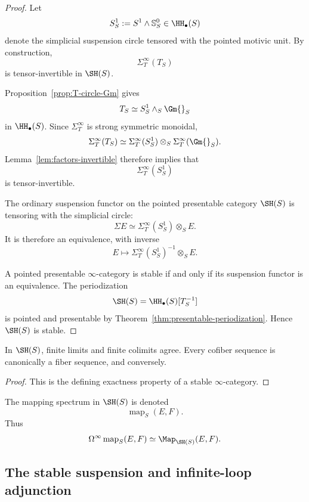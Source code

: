 \begin{proof}
Let
\[
    S^1_S
    :=
    S^1\wedge\mathbb S^0_S
    \in
    \HH_\bullet(S)
\]
denote the simplicial suspension circle tensored with the pointed motivic
unit.  By construction,
\[
    \Sigma_T^\infty(T_S)
\]
is tensor-invertible in \(\SH(S)\).

Proposition~\ref{prop:T-circle-Gm} gives
\[
    T_S
    \simeq
    S^1_S\wedge_S\Gm{}_S
\]
in \(\HH_\bullet(S)\).  Since \(\Sigma_T^\infty\) is strong symmetric
monoidal,
\[
    \Sigma_T^\infty(T_S)
    \simeq
    \Sigma_T^\infty(S^1_S)
    \otimes_S
    \Sigma_T^\infty(\Gm{}_S).
\]
Lemma~\ref{lem:factors-invertible} therefore implies that
\[
    \Sigma_T^\infty(S^1_S)
\]
is tensor-invertible.

The ordinary suspension functor on the pointed presentable category
\(\SH(S)\) is tensoring with the simplicial circle:
\[
    \Sigma E
    \simeq
    \Sigma_T^\infty(S^1_S)\otimes_SE.
\]
It is therefore an equivalence, with inverse
\[
    E
    \longmapsto
    \Sigma_T^\infty(S^1_S)^{-1}\otimes_SE.
\]

A pointed presentable \(\infty\)-category is stable if and only if its
suspension functor is an equivalence.  The periodization
\[
    \SH(S)
    =
    \HH_\bullet(S)[T_S^{-1}]
\]
is pointed and presentable by
Theorem~\ref{thm:presentable-periodization}.  Hence \(\SH(S)\) is stable.
\end{proof}

\begin{corollary}[Exactness]
\label{cor:SH-exactness}
In $\SH(S)$, finite limits and finite colimits agree.  Every cofiber sequence is canonically a fiber
sequence, and conversely.
\end{corollary}

\begin{proof}
This is the defining exactness property of a stable $\infty$-category.
\end{proof}

\begin{notation}
\label{not:mapping-spectra-SH}
The mapping spectrum in $\SH(S)$ is denoted
\[
    \operatorname{map}_S(E,F).
\]
Thus
\[
    \Omega^\infty\operatorname{map}_S(E,F)
    \simeq
    \Map_{\SH(S)}(E,F).
\]
\end{notation}

\subsection{The stable suspension and infinite-loop adjunction}

